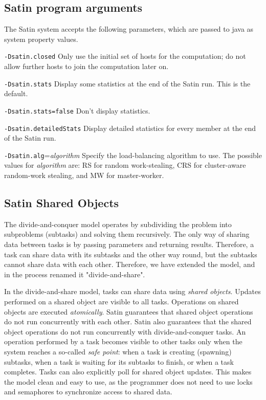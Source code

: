 \documentclass[10pt]{article}
\newcommand{\mysubsection}[1]{\subsection{#1}\label{#1}}
\begin{document}
\mysubsection{Satin program arguments}

The Satin system accepts the following parameters, which are
passed to java as system property values.
\begin{description}
\item{\texttt{-Dsatin.closed}}
Only use the initial set of hosts for the computation; do not allow
further hosts to join the computation later on.
\item{\texttt{-Dsatin.stats}}
Display some statistics at the end of the Satin run. This is the default.
\item{\texttt{-Dsatin.stats=false}}
Don't display statistics.
\item{\texttt{-Dsatin.detailedStats}}
Display detailed statistics for every member at the end of the Satin run.
\item{\texttt{-Dsatin.alg}=\emph{algorithm}}
Specify the load-balancing algorithm to use. The possible values for
\emph{algorithm} are: RS for random work-stealing, CRS for cluster-aware
random-work stealing, and MW for master-worker.
\end{description}

\mysubsection{Satin Shared Objects}

The divide-and-conquer model operates by subdividing the problem into
subproblems (subtasks) and solving them recursively.
The only way of sharing data between tasks is by passing parameters
and returning results.
Therefore, a task can share data with its subtasks and the
other way round, but the subtasks cannot share data with each other.
Therefore, we have extended the model, and in the process renamed it
"divide-and-share".

In the divide-and-share model, tasks can share data using
\textit{shared objects}.
Updates performed on a shared object are visible to all tasks.
Operations on shared objects are executed \textit{atomically}.
Satin guarantees that shared object operations do not run concurrently with
each other. Satin also guarantees that the shared object operations do not
run concurrently with divide-and-conquer tasks. An operation performed
by a task becomes visible to other tasks only when the system reaches a
so-called \textit{safe point}: when a task is creating (spawning)
subtasks, when a task is waiting for its subtasks to finish, or when a
task completes. Tasks can also explicitly poll for shared object
updates. This makes the model clean and easy to use, as the programmer
does not need to use locks and semaphores to synchronize access to
shared data.
\end{document}
